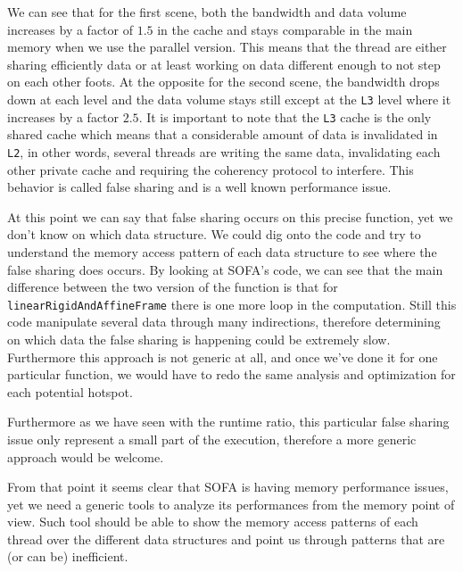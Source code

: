 We can see that for the first scene, both the bandwidth and data volume increases by a factor of $1.5$ in the cache and stays comparable in the main memory when we use the parallel version.
This means that the thread are either sharing efficiently data or at least working on data different enough to not step on each other foots.
At the opposite for the second scene, the bandwidth drops down at each level and the data volume stays still except at the \texttt{L3} level where it increases by a factor $2.5$.
It is important to note that the \texttt{L3} cache is the only shared cache which means that a considerable amount of data is invalidated in \texttt{L2}, in other words, several threads are writing the same data, invalidating each other private cache and requiring the coherency protocol to interfere.
This behavior is called false sharing and is a well known performance issue.

At this point we can say that false sharing occurs on this precise function, yet we don't know on which data structure.
We could dig onto the code and try to understand the memory access pattern of each data structure to see where the false sharing does occurs.
By looking at \gls{SOFA}'s code, we can see that the main difference between the two version of the function is that for \texttt{linearRigidAndAffineFrame} there is one more loop in the computation.
Still this code manipulate several data through many indirections, therefore determining on which data the false sharing is happening could be extremely slow.
Furthermore this approach is not generic at all, and once we've done it for one particular function, we would have to redo the same analysis and optimization for each potential hotspot.

Furthermore as we have seen with the runtime ratio, this particular false sharing issue only represent a small part of the execution, therefore a more generic approach would be welcome.

From that point it seems clear that \gls{SOFA} is having memory performance issues, yet we need a generic tools to analyze its performances from the memory point of view.
Such tool should be able to show the memory access patterns of each thread over the different data structures and point us through patterns that are (or can be) inefficient.

